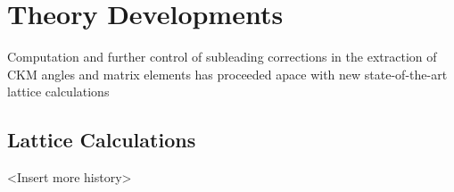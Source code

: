 %
%
%
%
%
%
%
%
%
%
\section{Theory Developments}
Computation and further control of subleading corrections in the extraction of CKM angles and matrix elements  has proceeded apace with new state-of-the-art lattice calculations 

\subsection{Lattice Calculations}
<Insert more history>

